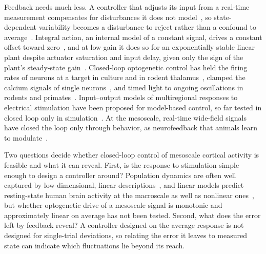 Feedback needs much less. A controller that adjusts its input from a real-time measurement compensates for disturbances
it does not model~\citep{astrom1995pid}, so state-dependent variability becomes a disturbance to reject rather than a
confound to average~\citep{grosenick2015closed, RittChing2015}. Integral action, an internal model of a constant
signal, drives a constant offset toward zero~\citep{francis1976internal}, and at low gain it does so for an
exponentially stable linear plant despite actuator saturation and input delay, given only the sign of the plant's
steady-state gain~\citep{logemann2000absolute}. Closed-loop optogenetic control has held the firing rates of neurons at a
target in culture and in rodent thalamus~\citep{newman2015optogenetic, bolus2018design, bolus2021state}, clamped the
calcium signals of single neurons~\citep{Zhang2018}, and timed light to ongoing oscillations in rodents and
primates~\citep{Siegle2014, nicholson2018analogue, kanta2019closed, Zaaimi2022}. Input--output models of multiregional
responses to electrical stimulation have been proposed for model-based control, so far tested in closed loop only in
simulation~\citep{Yang2018, Yang2021}. At the mesoscale, real-time wide-field signals have closed the loop only through
behavior, as neurofeedback that animals learn to modulate~\citep{clancy2014volitional, Neely2018, Gupta2026}.

Two questions decide whether closed-loop control of mesoscale cortical activity is feasible and what it can reveal.
First, is the response to stimulation simple enough to design a controller around? Population dynamics are often well
captured by low-dimensional, linear descriptions~\citep{Churchland2012, vyas2020computation}, and linear models predict
resting-state human brain activity at the macroscale as well as nonlinear ones~\citep{Nozari2024}, but whether
optogenetic drive of a mesoscale signal is monotonic and approximately linear on average has not been tested. Second,
what does the error left by feedback reveal? A controller designed on the average response is not designed for
single-trial deviations, so relating the error it leaves to measured state can indicate which fluctuations lie beyond
its reach.

